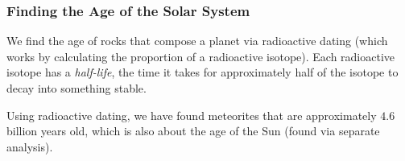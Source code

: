 \documentclass[class=article, crop=false]{standalone}
\begin{document}
  \subsubsection{Finding the Age of the Solar System}
  We find the age of rocks that compose a planet via radioactive dating (which works by calculating the proportion of a radioactive isotope). Each radioactive isotope has a \emph{half-life}, the time it takes for approximately half of the isotope to decay into something stable. \par
  Using radioactive dating, we have found meteorites that are approximately $4.6$ billion years old, which is also about the age of the Sun (found via separate analysis).
\end{document}
